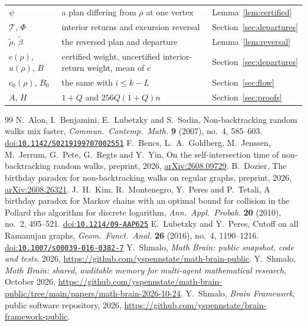 \documentclass[11pt]{amsart}
\theoremstyle{remark}
\newcommand{\doi}[1]{\href{https://doi.org/#1}{doi:\nolinkurl{#1}}}
\begin{document}
\begin{center}
\begin{tabular}{lll}
$\psi$ & a plan differing from $\rho$ at one vertex & Lemma~\ref{lem:certified}\\
$\mathcal T$, $\Phi$ & interior returns and excursion reversal & Section~\ref{sec:departures}\\
$\tilde\rho$, $\tilde\beta$ & the reversed plan and departure & Lemma~\ref{lem:reversal}\\
$c(\rho)$, $u(\rho)$, $B$ & certified weight, uncertified interior-return weight, mean of $c$ & Section~\ref{sec:departures}\\
$c_0(\rho)$, $B_0$ & the same with $i\le k-L$ & Section~\ref{sec:flow}\\
$A$, $H$ & $1+Q$ and $256Q(1+Q)n$ & Section~\ref{sec:proofs}\\
\bottomrule
\end{tabular}
\end{center}

\begin{thebibliography}{99}
 N.~Alon, I.~Benjamini, E.~Lubetzky and S.~Sodin, Non-backtracking random walks mix faster,
\emph{Commun.\ Contemp.\ Math.} \textbf{9} (2007), no.~4, 585--603. \doi{10.1142/S0219199707002551}
 F.~Bencs, L.~A.~Goldberg, M.~Jenssen, M.~Jerrum, G.~Pete, G.~Regts and Y.~Yin, On the self-intersection
time of non-backtracking random walks, preprint, 2026, \href{https://arxiv.org/abs/2608.09729}{arXiv:2608.09729}.
 B.~Dozier, The birthday paradox for non-backtracking walks on regular graphs, preprint, 2026,
\href{https://arxiv.org/abs/2608.26321}{arXiv:2608.26321}.
 J.~H.~Kim, R.~Montenegro, Y.~Peres and P.~Tetali, A birthday paradox for Markov chains with an
optimal bound for collision in the Pollard rho algorithm for discrete logarithm, \emph{Ann.\ Appl.\ Probab.}
\textbf{20} (2010), no.~2, 495--521. \doi{10.1214/09-AAP625}
 E.~Lubetzky and Y.~Peres, Cutoff on all Ramanujan graphs, \emph{Geom.\ Funct.\ Anal.}
\textbf{26} (2016), no.~4, 1190--1216. \doi{10.1007/s00039-016-0382-7}
 Y.~Shmalo, \emph{Math Brain: public snapshot, code and tests}, 2026,
\url{https://github.com/yspennstate/math-brain-public}.
 Y.~Shmalo, \emph{Math Brain: shared, auditable memory for multi-agent mathematical research},
October 2026, \url{https://github.com/yspennstate/math-brain-public/tree/main/papers/math-brain-2026-10-24}.
 Y.~Shmalo, \emph{Brain Framework}, public software repository, 2026,
\url{https://github.com/yspennstate/brain-framework-public}.
\end{thebibliography}
\end{document}
